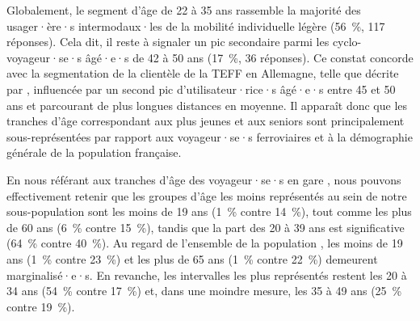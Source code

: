 \begin{refsegment}
Globalement, le segment d'âge de 22 à 35 ans rassemble la majorité des usager·ère·s intermodaux·les de la mobilité individuelle légère (56~\%, 117 réponses). Cela dit, il reste à signaler un pic secondaire parmi les cyclo-voyageur·se·s âgé·e·s de 42 à 50 ans (17~\%, 36 réponses). Ce constat concorde avec la segmentation de la clientèle de la \acrshort{TEFF} en Allemagne, telle que décrite par \textcolor{blue}{\textcite[4]{degele_identifying_2018}}, influencée par un second pic d'utilisateur·rice·s âgé·e·s entre 45 et 50 ans et parcourant de plus longues distances en moyenne. Il apparaît donc que les tranches d'âge correspondant aux plus jeunes et aux seniors sont principalement sous-représentées par rapport aux voyageur·se·s ferroviaires et à la démographie générale de la population française.%

En nous référant aux tranches d'âge des voyageur·se·s en gare \textcolor{blue}{\autocite{sncf_repartition_2017}}, nous pouvons effectivement retenir que les groupes d'âge les moins représentés au sein de notre sous-population sont les moins de 19 ans (1~\% contre 14~\%), tout comme les plus de 60 ans (6~\% contre 15~\%), tandis que la part des 20 à 39 ans est significative (64~\% contre 40~\%). Au regard de l'ensemble de la population \textcolor{blue}{\autocite{insee_age_2022}}, les moins de 19 ans (1~\% contre 23~\%) et les plus de 65 ans (1~\% contre 22~\%) demeurent marginalisé·e·s. En revanche, les intervalles les plus représentés restent les 20 à 34 ans (54~\% contre 17~\%) et, dans une moindre mesure, les 35 à 49 ans (25~\% contre 19~\%).%


\end{refsegment}
